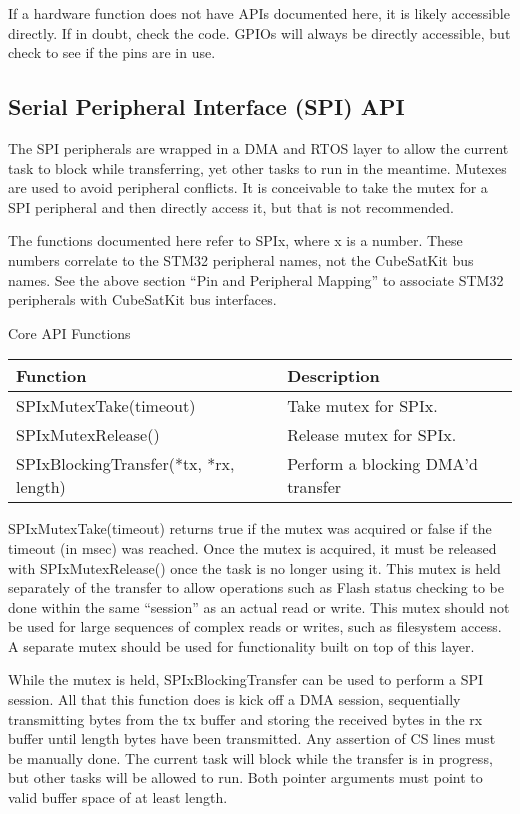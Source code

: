 \documentclass{article}
\begin{document}
If a hardware function does not have APIs documented here, it is likely
accessible directly. If in doubt, check the code. GPIOs will always be directly 
accessible, but check
to see if the pins are in use.

\subsection{Serial Peripheral Interface (SPI) API}
The SPI peripherals are wrapped in a DMA and RTOS layer to allow the current
task to block while transferring, yet other tasks to run in the meantime.
Mutexes are used to avoid peripheral conflicts. It is conceivable to take the
mutex for a SPI peripheral and then directly access it, but that is not
recommended.

The functions documented here refer to SPIx, where x is a number. These numbers
correlate to the STM32 peripheral names, not the CubeSatKit bus names. See
the above section ``Pin and Peripheral Mapping'' to associate STM32 peripherals
with CubeSatKit bus interfaces.

Core API Functions
\begin{center}
\begin{tabular}{| l | l |}
    \hline 
    Function & Description \\ \hline
    SPIxMutexTake(timeout) & Take mutex for SPIx.  \\ \hline
    SPIxMutexRelease() & Release mutex for SPIx. \\ \hline
    SPIxBlockingTransfer(*tx, *rx, length) & Perform a blocking DMA'd transfer \\ \hline
\end{tabular}
\end{center}

SPIxMutexTake(timeout) returns true if the mutex was acquired or false if the
timeout (in msec) was reached. Once the mutex is acquired, it must be released
with SPIxMutexRelease()
once the task is no longer using it. This mutex is held separately of the
transfer to allow operations such as Flash status checking to be done within the
same ``session'' as an actual read or write. This mutex should not be used for
large sequences of complex reads or writes, such as filesystem access. A separate
mutex should be used for functionality built on top of this layer.
    
While the mutex is held, SPIxBlockingTransfer can be used to perform a SPI session.
All that this function does is kick off a DMA session, sequentially transmitting
bytes from the tx buffer and storing the received bytes in the rx buffer until
length bytes have been transmitted. Any assertion of CS lines must be manually
done. The current task will block while the transfer is in progress, but other
tasks will be allowed to run. Both pointer arguments must point to valid buffer
space of at least length.
\end{document}
